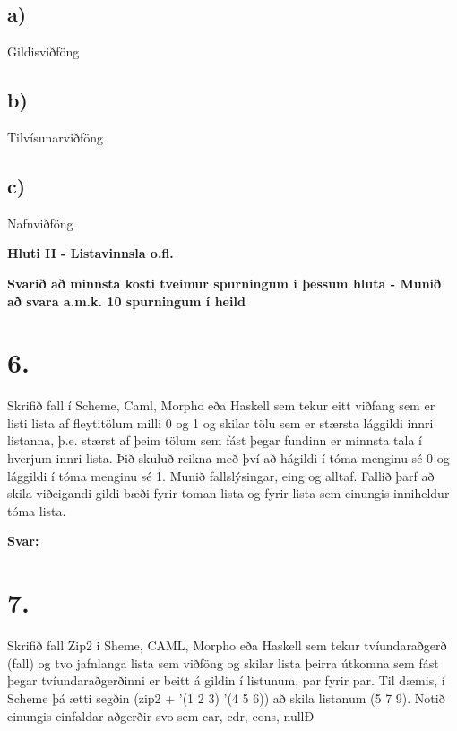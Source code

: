 \documentclass{article}
\begin{document}
     \subsection{a)} Gildisviðföng 

     \subsection{b)} Tilvísunarviðföng

     \subsection{c)} Nafnviðföng


     \newpage

     \begin{center}
        \textbf{Hluti II - Listavinnsla o.fl.}


        \textbf{Svarið að minnsta kosti tveimur spurningum i þessum hluta - Munið að svara a.m.k. 10 spurningum í heild}
     \end{center}

     \section{6.}
     Skrifið fall í Scheme, Caml, Morpho eða Haskell sem tekur eitt viðfang sem er listi lista af fleytitölum milli 0 og 1 og skilar tölu sem 
     er stærsta lággildi innri listanna, þ.e. stærst af þeim tölum sem fást 
     þegar fundinn er minnsta tala í hverjum innri lista. Þið skuluð reikna
     með því að hágildi í tóma menginu sé 0 og lággildi í tóma menginu sé 1.
     Munið fallslýsingar, eing og alltaf. Fallið þarf að skila viðeigandi 
     gildi bæði fyrir toman lista og fyrir lista sem einungis inniheldur tóma lista.

     \textbf{Svar:}



     \newpage 

     \section{7.}

     Skrifið fall Zip2 i Sheme, CAML, Morpho eða Haskell sem tekur 
     tvíundaraðgerð (fall) og tvo jafnlanga lista sem viðföng og skilar lista þeirra útkomna sem fást þegar tvíundaraðgerðinni er beitt á
     gildin í listunum, par fyrir par. Til dæmis, í Scheme þá ætti segðin
     (zip2 + '(1 2 3) '(4 5 6)) að skila listanum (5 7 9). Notið einungis
     einfaldar aðgerðir svo sem car, cdr, cons, nullÐ
\end{document}
